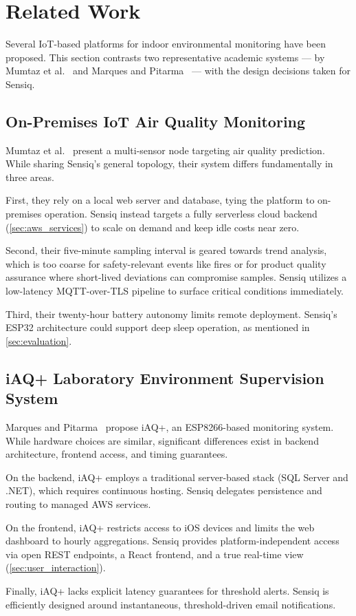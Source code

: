 \section{Related Work}\label{sec:related_work}

Several IoT-based platforms for indoor environmental monitoring have been
proposed. This section contrasts two representative academic systems ---
by Mumtaz et al.~\cite{mumtaz2021internet} and Marques and Pitarma~\cite{marques2019internet} ---
with the design decisions taken for Sensiq.

\subsection{On-Premises IoT Air Quality Monitoring}\label{sec:rw_mumtaz}

Mumtaz et al.~\cite{mumtaz2021internet} present a multi-sensor node targeting
air quality prediction. While sharing Sensiq's general topology, their system
differs fundamentally in three areas.

First, they rely on a local web server and database, tying the platform to
on-premises operation. Sensiq instead targets a fully serverless cloud backend
(\cref{sec:aws_services}) to scale on demand and keep idle costs near zero.

Second, their five-minute sampling interval is geared towards trend analysis,
which is too coarse for safety-relevant events like fires or for product quality
assurance where short-lived deviations can compromise samples. Sensiq utilizes a
low-latency MQTT-over-TLS pipeline to surface critical conditions immediately.

Third, their twenty-hour battery autonomy limits remote deployment. Sensiq's ESP32
architecture could support deep sleep operation, as mentioned in \cref{sec:evaluation}.

\subsection{iAQ+ Laboratory Environment Supervision System}\label{sec:rw_marques}

Marques and Pitarma~\cite{marques2019internet} propose iAQ+, an ESP8266-based
monitoring system. While hardware choices are similar, significant differences exist
in backend architecture, frontend access, and timing guarantees.

On the backend, iAQ+ employs a traditional server-based stack (SQL Server and .NET),
which requires continuous hosting. Sensiq delegates persistence and routing
to managed AWS services.

On the frontend, iAQ+ restricts access to iOS devices and limits the web dashboard
to hourly aggregations. Sensiq provides platform-independent access via open REST endpoints,
a React frontend, and a true real-time view (\cref{sec:user_interaction}).

Finally, iAQ+ lacks explicit latency guarantees for threshold alerts. Sensiq
is efficiently designed around instantaneous, threshold-driven email notifications.